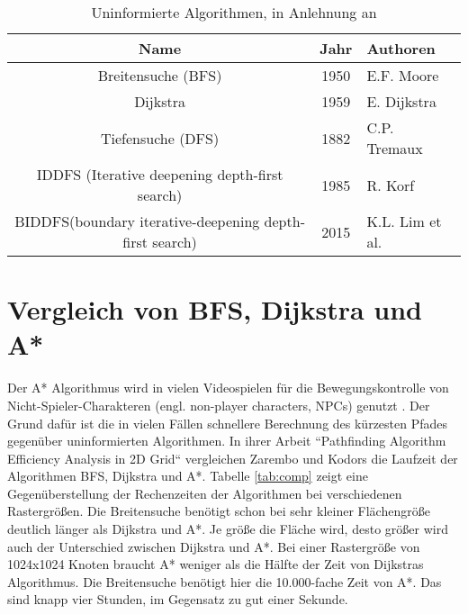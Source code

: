 \begin{table}[H]
	\begin{tabularx}{\linewidth}{|c|c|X|}
		\hline
		\textbf{Name}                                                    & \textbf{Jahr} & \textbf{Authoren}        \\ \hline
		Breitensuche (BFS)                                      & 1950 & E.F. Moore      \\ \hline
		Dijkstra                                                & 1959 & E. Dijkstra     \\ \hline
		Tiefensuche (DFS)                                       & 1882 & C.P. Tremaux    \\ \hline
		IDDFS (Iterative deepening depth-first search)          & 1985 & R. Korf         \\ \hline
		BIDDFS(boundary iterative-deepening depth-first search) & 2015 & K.L. Lim et al. \\ \hline
	\end{tabularx}
\caption{\label{tab:uninformed}Uninformierte Algorithmen, in Anlehnung an \cite[S. 233]{Noo15}}
\end{table}

\section{Vergleich von BFS, Dijkstra und A*}

Der A* Algorithmus wird in vielen Videospielen für die Bewegungskontrolle von Nicht-Spieler-Charakteren (engl. non-player characters, NPCs) genutzt \cite{Stamford.2014}. Der Grund dafür ist die in vielen Fällen schnellere Berechnung des kürzesten Pfades gegenüber uninformierten Algorithmen. In ihrer Arbeit ``Pathfinding Algorithm Efficiency Analysis in 2D Grid`` vergleichen Zarembo und Kodors die Laufzeit der Algorithmen BFS, Dijkstra und A*. Tabelle \ref{tab:comp} zeigt eine Gegenüberstellung der Rechenzeiten der Algorithmen bei verschiedenen Rastergrößen. Die Breitensuche benötigt schon bei sehr kleiner Flächengröße deutlich länger als Dijkstra und A*. Je größe die Fläche wird, desto größer wird auch der Unterschied zwischen Dijkstra und A*. Bei einer Rastergröße von 1024x1024 Knoten braucht A* weniger als die Hälfte der Zeit von Dijkstras Algorithmus. Die Breitensuche benötigt hier die 10.000-fache Zeit von A*. Das sind knapp vier Stunden, im Gegensatz zu gut einer Sekunde.

